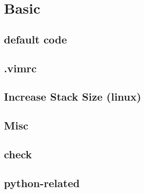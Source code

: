 \documentclass[a4paper,10pt,twocolumn,oneside]{article}
\begin{document}
\pagestyle{fancy}
\fancyhead[R]{\thepage}
\renewcommand{\headrulewidth}{0.4pt}
\renewcommand{\contentsname}{Contents} 

\scriptsize
\tableofcontents


\section{Basic}

\subsection{default code}


\subsection{.vimrc}


\subsection{Increase Stack Size (linux)}


% 

\subsection{Misc}


\subsection{check}


\subsection{python-related}


% 
\end{document}
